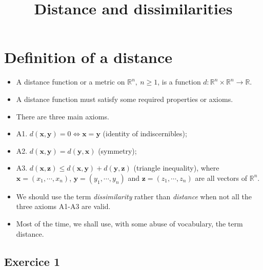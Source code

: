 \documentclass[
]{article}
\title{Distance and dissimilarities}
\author{}
\date{\vspace{-2.5em}}
\newenvironment{Shaded}{\begin{snugshade}}{\end{snugshade}}
\newcommand{\DataTypeTok}[1]{\textcolor[rgb]{0.13,0.29,0.53}{#1}}
\newcommand{\KeywordTok}[1]{\textcolor[rgb]{0.13,0.29,0.53}{\textbf{#1}}}
\newcommand{\NormalTok}[1]{#1}
\newcommand{\OperatorTok}[1]{\textcolor[rgb]{0.81,0.36,0.00}{\textbf{#1}}}
\newcommand{\OtherTok}[1]{\textcolor[rgb]{0.56,0.35,0.01}{#1}}
\begin{document}
\maketitle

{
\setcounter{tocdepth}{2}
\tableofcontents
}
\begin{Shaded}
\end{Shaded}

\hypertarget{definition-of-a-distance}{%
\section{Definition of a distance}\label{definition-of-a-distance}}

\begin{itemize}
\item
  A distance function or a metric on \(\mathbb{R}^n,\:n\geq 1\), is a
  function \(d:\mathbb{R}^n\times\mathbb{R}^n\rightarrow \mathbb{R}\).
\item
  A distance function must satisfy some required properties or axioms.
\item
  There are three main axioms.
\item
  A1. \(d(\mathbf{x},\mathbf{y})= 0\iff \mathbf{x}=\mathbf{y}\)
  (identity of indiscernibles);
\item
  A2. \(d(\mathbf{x},\mathbf{y})= d(\mathbf{y},\mathbf{x})\) (symmetry);
\item
  A3.
  \(d(\mathbf{x},\mathbf{z})\leq d(\mathbf{x},\mathbf{y})+d(\mathbf{y},\mathbf{z})\)
  (triangle inequality), where \(\mathbf{x}=(x_1,\cdots,x_n)\),
  \(\mathbf{y}=(y_1,\cdots,y_n)\) and \(\mathbf{z}=(z_1,\cdots,z_n)\)
  are all vectors of \(\mathbb{R}^n\).
\item
  We should use the term \emph{dissimilarity} rather than
  \emph{distance} when not all the three axioms A1-A3 are valid.
\item
  Most of the time, we shall use, with some abuse of vocabulary, the
  term distance.
\end{itemize}

\hypertarget{exercice-1}{%
\subsection{Exercice 1}\label{exercice-1}}
\end{document}
